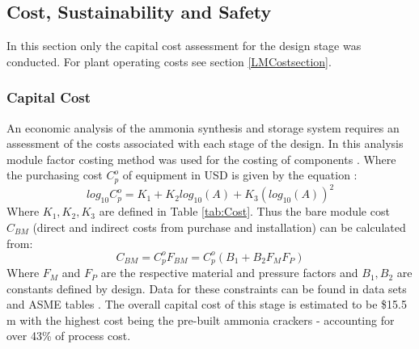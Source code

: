 \subsection{Cost, Sustainability and Safety}

In this section only  the capital cost assessment for the design stage was conducted. For plant operating costs see section \ref{LMCostsection}.
\subsubsection{Capital Cost}
An economic analysis of the ammonia synthesis and storage system requires an assessment of the costs associated with each stage of the design. In this analysis module factor costing method was used for the costing of components \cite{RichardTurtonRichardC.BailieWallaceB.Whiting2013}. Where the purchasing cost $C_p^o$ of equipment in USD is given by the equation \cite{Banares-alcantara2014}:
\begin{equation}
	log_{10}C_p^o = K_1 + K_2log_{10}(A)+K_3(log_{10}(A))^2
\end{equation}
Where $K_1,K_2,K_3$ are defined in Table \ref{tab:Cost}. Thus the bare module cost $C_{BM}$ (direct and indirect costs from purchase and installation) can be calculated from:
\begin{equation}
C_{BM} =C_p^oF_{BM} = C_p^o(B_1+B_2F_MF_P)
\end{equation}
Where $F_M$ and $F_P$ are the respective material and pressure factors and $B_1, B_2$ are constants defined by design. Data for these constraints can be found in data sets and ASME tables \cite{RichardTurtonRichardC.BailieWallaceB.Whiting2013}. The overall capital cost of this stage is estimated to be \$15.5 m with the highest cost being the pre-built ammonia crackers - accounting for over 43\% of process cost.

